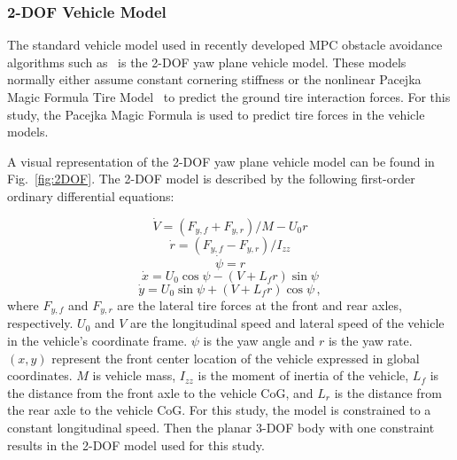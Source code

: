 \documentclass[12pt,twocolumn]{article}
\begin{document}

\subsubsection{2-DOF Vehicle Model}\label{sss:2DOFModel}
The standard vehicle model used in recently developed MPC obstacle avoidance algorithms such as~\cite{ModelFidelity2016} is the 2-DOF yaw plane vehicle model. These models normally either assume constant cornering stiffness or the nonlinear Pacejka Magic Formula Tire Model~\cite{Pacejka1997} to predict the ground tire interaction forces. For this study, the Pacejka Magic Formula is used to predict tire forces in the vehicle models.   

A visual representation of the 2-DOF yaw plane vehicle model can be found in Fig.~\ref{fig:2DOF}. The 2-DOF model is described by the following first-order ordinary differential equations:

\begin{equation}\label{e:2DOF_Vdot}
\dot{V} = \left(F_{y,f} + F_{y,r}\right)/{M - U_0r} 
\end{equation}
\begin{equation}\label{e:2DOF_rdot}
\dot{r} = \left(F_{y,f} - F_{y,r}\right)/I_{zz}
\end{equation}
\begin{equation}\label{e:2DOF_psidot}
\dot{\psi} = r 
\end{equation}
\begin{equation}\label{e:2DOF_xdot}
\dot{x} = U_0\cos{\psi}-\left(V+L_fr\right)\sin{\psi}
\end{equation}
\begin{equation}\label{e:2DOF_ydot}
\dot{y} = U_0\sin{\psi}+\left(V+L_fr\right)\cos{\psi} \,,
\end{equation}
%
where $F_{y,f}$ and $F_{y,r}$ are the lateral tire forces at the front and rear axles, respectively. $U_0$ and $V$ are the longitudinal speed and lateral speed of the vehicle in the vehicle's coordinate frame. $\psi$ is the yaw angle and $r$ is the yaw rate. $\left(x,y\right)$ represent the front center location of the vehicle expressed in global coordinates. $M$ is vehicle mass, $I_{zz}$ is the moment of inertia of the vehicle, $L_f$ is the distance from the front axle to the vehicle CoG, and $L_r$ is the distance from the rear axle to the vehicle CoG. For this study, the model is constrained to a constant longitudinal speed. Then the planar 3-DOF body with one constraint results in the 2-DOF model used for this study.
\end{document}
